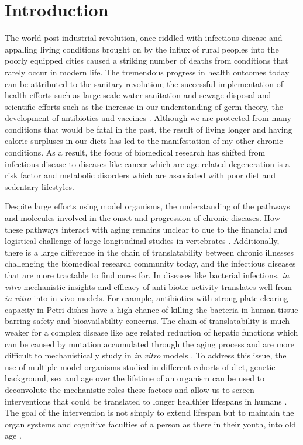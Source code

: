 \documentclass[a4paper,11pt,twoside]{book}
\begin{document}
	\chapter{Introduction}
	
	The world post-industrial revolution, once riddled with infectious disease and appalling living conditions brought on by the influx of rural peoples into the poorly equipped cities caused a striking number of deaths from conditions that rarely occur in modern life\citep{JOEPINSKER2013}. The tremendous progress in health outcomes today can be attributed to the sanitary revolution; the successful implementation of health efforts such as large-scale water sanitation and sewage disposal and scientific efforts such as the increase in our understanding of germ theory, the development of antibiotics and vaccines \citep{Mackenbach2007}. Although we are protected from many conditions that would be fatal in the past, the result of living longer and having caloric surpluses in our diets has led to the manifestation of my other chronic conditions. As a result, the focus of biomedical research has shifted from infectious disease to diseases like cancer which are age-related degeneration is a risk factor and metabolic disorders which are associated with poor diet and sedentary lifestyles. 
	
	Despite large efforts using model organisms, the understanding of the pathways and molecules involved in the onset and progression of chronic diseases. How these pathways interact with aging remains unclear to due to the financial and logistical challenge of large longitudinal studies in vertebrates \citep{Williams2015TheAnalysis}. Additionally, there is a large difference in the chain of translatability between chronic illnesses challenging the biomedical research community today, and the infectious diseases that are more tractable to find cures for. In diseases like bacterial infections, \textit{in vitro} mechanistic insights and efficacy of anti-biotic activity translates well from \textit{in vitro} into in vivo models\citep{Moffat2017a}. For example, antibiotics with strong plate clearing capacity in Petri dishes have a high chance of killing the bacteria in human tissue barring safety and bioavailability concerns. The chain of translatability is much weaker for a complex disease like age related reduction of hepatic functions which can be caused by mutation accumulated through the aging process and are more difficult to mechanistically study in \textit{in vitro} models \citep{Moffat2017a}. To address this issue, the use of multiple model organisms studied in different cohorts of diet, genetic background, sex and age over the lifetime of an organism can be used to deconvolute the mechanistic roles these factors and allow us to screen interventions that could be translated to longer healthier lifespans in humans \citep{Armanios2015}. The goal of the intervention is not simply to extend lifespan but to maintain the organ systems and cognitive faculties of a person as there in their youth, into old age \citep{Armanios2015}.
	
\end{document}

